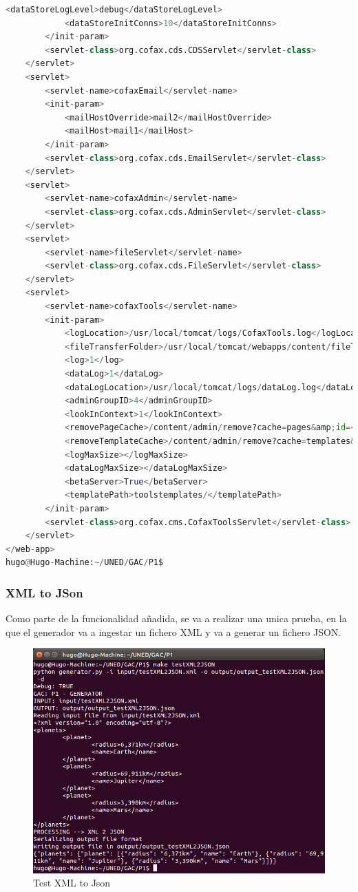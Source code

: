 \documentclass[a4paper,11pt]{book}
\begin{document}
\begin{lstlisting}[language=python,caption={make testServlet }]
			<dataStoreLogLevel>debug</dataStoreLogLevel>
			<dataStoreInitConns>10</dataStoreInitConns>
		</init-param>
		<servlet-class>org.cofax.cds.CDSServlet</servlet-class>
	</servlet>
	<servlet>
		<servlet-name>cofaxEmail</servlet-name>
		<init-param>
			<mailHostOverride>mail2</mailHostOverride>
			<mailHost>mail1</mailHost>
		</init-param>
		<servlet-class>org.cofax.cds.EmailServlet</servlet-class>
	</servlet>
	<servlet>
		<servlet-name>cofaxAdmin</servlet-name>
		<servlet-class>org.cofax.cds.AdminServlet</servlet-class>
	</servlet>
	<servlet>
		<servlet-name>fileServlet</servlet-name>
		<servlet-class>org.cofax.cds.FileServlet</servlet-class>
	</servlet>
	<servlet>
		<servlet-name>cofaxTools</servlet-name>
		<init-param>
			<logLocation>/usr/local/tomcat/logs/CofaxTools.log</logLocation>
			<fileTransferFolder>/usr/local/tomcat/webapps/content/fileTransferFolder</fileTransferFolder>
			<log>1</log>
			<dataLog>1</dataLog>
			<dataLogLocation>/usr/local/tomcat/logs/dataLog.log</dataLogLocation>
			<adminGroupID>4</adminGroupID>
			<lookInContext>1</lookInContext>
			<removePageCache>/content/admin/remove?cache=pages&amp;id=</removePageCache>
			<removeTemplateCache>/content/admin/remove?cache=templates&amp;id=</removeTemplateCache>
			<logMaxSize></logMaxSize>
			<dataLogMaxSize></dataLogMaxSize>
			<betaServer>True</betaServer>
			<templatePath>toolstemplates/</templatePath>
		</init-param>
		<servlet-class>org.cofax.cms.CofaxToolsServlet</servlet-class>
	</servlet>
</web-app>
hugo@Hugo-Machine:~/UNED/GAC/P1$
\end{lstlisting}
 
\subsubsection{XML to JSon}
Como parte de la funcionalidad añadida, se va a realizar una unica prueba, en la que el generador va a ingestar un fichero XML y va a generar un fichero JSON.  

\begin{figure}[H]  
\centering 
\includegraphics[scale=0.35]{imagenes/testXML2JSON.png}
\caption{ Test XML to Json  }  
\end{figure}
 
\end{document}
